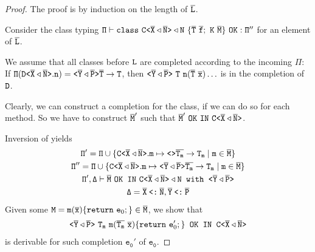 \begin{proof}
  The proof is by induction on the length of $\overline{\tt L}$.

  Consider the class typing $\mathtt{ \Pi \vdash \texttt{class}\ \mathtt{C \texttt{<} \overline{\tt X} 
        \triangleleft \overline{\tt N} \texttt{>} } \triangleleft N\ \{ \overline{\tt T} \
      \overline{\tt f}; \ K \ \overline{\tt M} \} \ \texttt{OK} : \Pi''}$ for an element of $\overline{\tt L}$.

    We assume that all classes before ${\tt L}$ are completed according to the incoming $\mathtt{\Pi}$:
    If $\mathtt{\Pi (\mathtt{D \texttt{<} \overline{\tt X} \triangleleft \overline{\tt N} \texttt{>} }.n)} = \mathtt{\mathtt{ \texttt{<} \overline{\tt Y} \triangleleft  \overline{\tt P} \texttt{>} }
      \overline{\tt T} \to T}$, then $\mathtt{\exptype{}{\ol{Y} \triangleleft  \ol{P}}\ T\ \mv{n}(\ol{T}\
      \ol{x}) \dots}$ is in the completion of ${\tt D}$.

    Clearly, we can construct a completion for the class, if we can do so for each method. So we
    have to construct $\overline{\tt M}'$ such that $\mathtt{\ol{M}'\ \mathtt{OK\ IN}\ \exptype{C}{\ol{X} 
        \triangleleft \ol{N}}}$. 

    Inversion of  yields
    \begin{gather}
      \label{eq:3}
      \mathtt{\Pi' = \Pi \cup \{ \mathtt{C \texttt{<} \overline{\tt X} \triangleleft \overline{\tt N} \texttt{>} }.m \mapsto \mathtt{ \texttt{<}  \texttt{>} } \overline{\tt T_m} \to T_m \mid m \in \overline{\tt M} \} } \\
      \mathtt{\Pi'' = \Pi \cup \{ \mathtt{C \texttt{<} \overline{\tt X} \triangleleft \overline{\tt N} \texttt{>} }.m \mapsto
          \mathtt{ \texttt{<} \overline{\tt Y} \triangleleft  \overline{\tt P} \texttt{>} } \overline{\tt T_m} \to T_m \mid m \in \overline{\tt M} \} } \\
      \label{eq:5}
      \mathtt{\Pi', \Delta \vdash \overline{\tt M} \ \texttt{OK IN}\
        \mathtt{C \texttt{<} \overline{\tt X} \triangleleft \overline{\tt N} \texttt{>} } \triangleleft N  \texttt{
          with } \mathtt{ \texttt{<} \overline{\tt Y} \triangleleft  \overline{\tt P} \texttt{>} }} \\
      \label{eq:7}
      \mathtt{\Delta = \overline{\tt X} \mathbin{\texttt{<:}}  \overline{\tt N}, \overline{\tt Y} \mathbin{\texttt{<:}}  \overline{\tt P}}
    \end{gather}
    Given some ${\tt M} = \texttt{m}(\overline{\tt \mathtt{x}}) \{\texttt{return}\ \mathtt{e}_0;\} \in \overline{\tt M}$,
    we show that
    \begin{gather}
      \label{eq:4}
      \exptype{}{\ol{Y} \triangleleft  \ol{P}}\ \mathtt{T_m}\ \texttt{m}(\ol{T_m}\ \ol{{x}})
      \{\texttt{return}\ \mathtt{e}'_0;\} \texttt{ OK IN }\exptype{C}{\ol{X} \triangleleft \ol{N}}
    \end{gather}
    is derivable for such completion $\mathtt{e_0'}$ of $\mathtt{e_0}$.


\end{proof}
